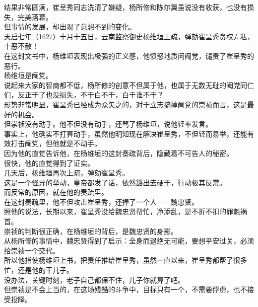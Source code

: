 \begin{multicols}{\theparacolNo}
结果非常圆满，崔呈秀同志洗清了嫌疑，杨所修和陈尔翼虽说没有收获，也没有损失，完美落幕。\\

但事情的发展，却出现了意想不到的变化。\\

天启七年（1627）十月十五日，云南监察御史杨维垣上疏，弹劾崔呈秀贪权弄私，十恶不赦！\\

在这封文书中，杨维垣表现出极强的正义感，他愤怒地质问阉党，谴责了崔呈秀的恶行。\\

杨维垣是阉党。\\

说起来大家的智商都不低，杨所修的创意不但属于他，也属于无数无耻的阉党同仁们，反正干了也没损失，不干白不干，白干谁不干？\\

形势非常明显，崔呈秀已经成为众矢之的，对于立志搞掉阉党的崇祯而言，这是最好的机会。\\

但崇祯没有动手。他不但没有动手，还骂了杨维垣，说他轻率发言。\\

事实上，他确实不打算动手，虽然他明知现在解决崔呈秀，不但轻而易举，还能有效打击阉党，但他就是不动手。\\

因为他的直觉告诉他，在杨维垣的这封奏疏背后，隐藏着不可告人的秘密。\\

很快，他的直觉得到了证实。\\

几天后，杨维垣再次上疏，弹劾崔呈秀。\\

这是一个怪异的举动，皇帝都发了话，依然豁出去硬干，行动极其反常。\\

而反常的原因，就在他的奏疏里。\\

在这封奏疏里，他不但攻击崔呈秀，还捧了一个人——魏忠贤。\\

照他的说法，长期以来，崔呈秀没给魏忠贤帮忙，净添乱，是不折不扣的罪魁祸首。\\

崇祯的判断很正确，在杨维垣的背后，是魏忠贤的身影。\\

从杨所修的事情中，魏忠贤得到了启示：全身而退绝无可能，要想平安过关，必须给崇祯一个交代。\\

所以他指使杨维垣上书，把责任推给崔呈秀，虽然一直以来，崔呈秀都帮了很多忙，还是他的干儿子。\\

没办法，关键时刻，老子自己都保不住，儿子你就算了吧。\\

但崇祯是不会上当的，在这场残酷的斗争中，目标只有一个，不需要俘虏，也不接受投降。\\
\ifnum{}
	\end{multicols}
\fi
\newpage
